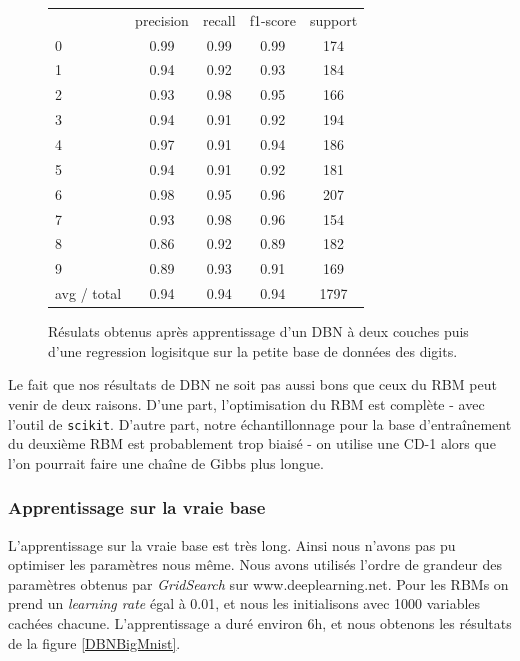 \documentclass[10pt,a4paper]{article}
\begin{document}
\begin{figure}[ht!]
\centering
	\begin{tabular}{l|c|c|c|c}
	& precision   & recall  &f1-score &  support \\
          0&       0.99&      0.99&      0.99    &   174 \\
          1 &      0.94 &     0.92 &     0.93    &   184\\
          2  &     0.93  &    0.98  &    0.95       &166\\
          3   &    0.94   &   0.91   &   0.92       &194\\
          4    &   0.97    &  0.91    &  0.94      & 186\\
          5     &  0.94     & 0.91     & 0.92     &  181\\
          6      & 0.98      &0.95      &0.96    &   207\\
          7       &0.93&      0.98&      0.96   &    154\\
          8&       0.86 &     0.92 &     0.89  &     182\\
          9 &      0.89  &    0.93  &    0.91 &      169\\
avg / total  &     0.94   &   0.94   &   0.94&      1797\\
	\end{tabular}
	\label{DBNDigits}
	\caption{Résulats obtenus après apprentissage d'un DBN à deux couches puis d'une regression logisitque sur la petite base de données des digits.}
\end{figure}

Le fait que nos résultats de DBN ne soit pas aussi bons que ceux du RBM peut venir de deux raisons. D'une part, l'optimisation du RBM est complète - avec l'outil de \texttt{scikit}. D'autre part, notre échantillonnage pour la base d'entraînement du deuxième RBM est probablement trop biaisé - on utilise une CD-1 alors que l'on pourrait faire une chaîne de Gibbs plus longue. 

\subsubsection{Apprentissage sur la vraie base}


L'apprentissage sur la vraie base est très long. Ainsi nous n'avons pas pu optimiser les paramètres nous même. Nous avons utilisés l'ordre de grandeur des paramètres obtenus par \textit{GridSearch} sur www.deeplearning.net. Pour les RBMs on prend un \emph{learning rate} égal à 0.01, et nous les initialisons avec 1000 variables cachées chacune. L'apprentissage a duré environ 6h, et nous obtenons les résultats de la figure \ref{DBNBigMnist}.
\end{document}
